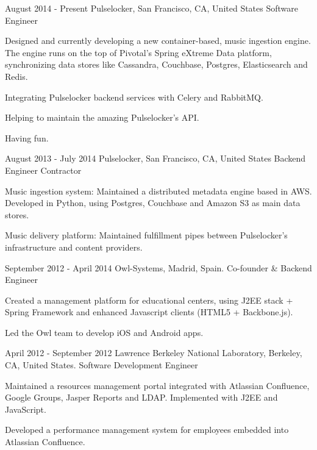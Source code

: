 
\experience
  {August 2014 - Present}
  {Pulselocker, San Francisco, CA, United States}
  {Software Engineer}
  {\vspace{-1em}\begin{rlist}
    \item Designed and currently developing a new container-based, music ingestion engine. The engine
    runs on the top of Pivotal's Spring eXtreme Data platform, synchronizing data stores
    like Cassandra, Couchbase, Postgres, Elasticsearch and Redis.
    \item Integrating Pulselocker backend services with Celery and RabbitMQ.
    \item Helping to maintain the amazing Pulselocker's API.
    \item Having fun.
  \end{rlist}}

\experience
  {August 2013 - July 2014}
  {Pulselocker, San Francisco, CA, United States}
  {Backend Engineer Contractor}
  {\vspace{-1em}\begin{rlist}
    \item Music ingestion system: Maintained a distributed metadata engine based in AWS. Developed
    in Python, using Postgres, Couchbase and Amazon S3 as main data stores.
    \item Music delivery platform: Maintained fulfillment pipes between Pulselocker's
    infrastructure and content providers.
  \end{rlist}}

\experience
  {September 2012 - April 2014}
  {Owl-Systems, Madrid, Spain.}
  {Co-founder \& Backend Engineer}
  {\vspace{-1em}\begin{rlist}
    \item Created a management platform for educational centers, using J2EE stack + Spring
    Framework and enhanced Javascript clients (HTML5 + Backbone.js).
    \item Led the Owl team to develop iOS and Android apps.
  \end{rlist}}

\experience
  {April 2012 - September 2012}
  {Lawrence Berkeley National Laboratory, Berkeley, CA, United States.}
  {Software Development Engineer}
  {\vspace{-1em}\begin{rlist}
    \item Maintained a resources management portal integrated with Atlassian Confluence,
    Google Groups, Jasper Reports and LDAP. Implemented with J2EE and JavaScript.
    \item Developed a performance management system for employees embedded into Atlassian Confluence.
  \end{rlist}}

